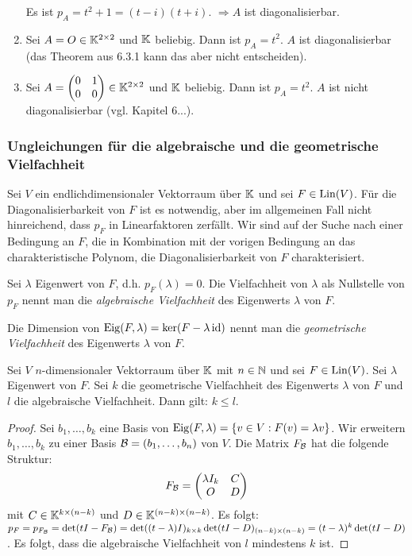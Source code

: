 \begin{bspe}
\begin{enumerate}
			Es ist $ p_A = t^2 + 1 = (t-i)(t+i) $. $ \Rightarrow A $ ist diagonalisierbar.
		\item
			Sei $ A = O \in \mathbb K^{2 \times 2} $ und $ \mathbb K $ beliebig. Dann ist $ p_A = t^2 $. $ A $ ist diagonalisierbar (das Theorem aus 6.3.1 kann das aber nicht entscheiden).
		\item
			Sei $ A = \begin{pmatrix}
				0 & 1 \\
				0 & 0
			\end{pmatrix} \in \mathbb K^{2 \times 2} $ und $ \mathbb K $ beliebig. Dann ist $ p_A = t^2 $. $ A $ ist nicht diagonalisierbar (vgl. Kapitel 6...).
	\end{enumerate}
\end{bspe}

\subsubsection{Ungleichungen für die algebraische und die geometrische Vielfachheit}
\label{sec:6_3_3}

Sei $ V $ ein endlichdimensionaler Vektorraum über $ \mathbb K $ und sei $ F \in \operatorname{Lin}(V) $. Für die Diagonalisierbarkeit von $ F $ ist es notwendig, aber im allgemeinen Fall nicht hinreichend, dass $ p_F $ in Linearfaktoren zerfällt. Wir sind auf der Suche nach einer Bedingung an $ F $, die in Kombination mit der vorigen Bedingung an das charakteristische Polynom, die Diagonalisierbarkeit von $ F $ charakterisiert.

Sei $ \lambda $ Eigenwert von $ F $, d.h. $ p_F(\lambda) = 0 $. Die Vielfachheit von $ \lambda $ als Nullstelle von $ p_F $ nennt man die \emph{algebraische Vielfachheit} des Eigenwerts $ \lambda $ von $ F $.

Die Dimension von $ \operatorname{Eig}(F,\lambda) = \ker(F - \lambda \operatorname{id}) $ nennt man die \emph{geometrische Vielfachheit} des Eigenwerts $ \lambda $ von $ F $.

\begin{thm}
	Sei $ V $ $ n $-dimensionaler Vektorraum über $ \mathbb K $ mit $ n \in \mathbb N $ und sei $ F \in \operatorname{Lin}(V) $. Sei $ \lambda $ Eigenwert von $ F $. Sei $ k $ die geometrische Vielfachheit des Eigenwerts $ \lambda $ von $ F $ und $ l $ die algebraische Vielfachheit. Dann gilt: $ k \leq l $.
\end{thm}
\begin{proof}
	Sei $ b_1, \ldots, b_k $ eine Basis von $ \operatorname{Eig}(F,\lambda) = \{ v \in V : F(v) = \lambda v \} $. Wir erweitern $ b_1, \ldots, b_k $ zu einer Basis $ \mathcal{B} = (b_1, \ldots, b_n) $ von $ V $. Die Matrix $ F_{\mathcal{B}} $ hat die folgende Struktur:
	\begin{equation*}
		F_{\mathcal{B}} = \begin{pmatrix}
			\lambda I_k & C \\
			O & D
		\end{pmatrix}
	\end{equation*}
	mit $ C \in \mathbb K^{k \times (n-k)} $ und $ D \in \mathbb K^{(n-k) \times (n-k)} $. Es folgt: $ p_F = p_{F_{\mathcal{B}}} = \det(tI - F_{\mathcal{B}}) = \det((t - \lambda)I)_{k \times k}\det(tI - D)_{(n-k) \times (n-k)} = (t - \lambda)^k \det(tI - D) $. Es folgt, dass die algebraische Vielfachheit von $ l $ mindestens $ k $ ist.
\end{proof}

